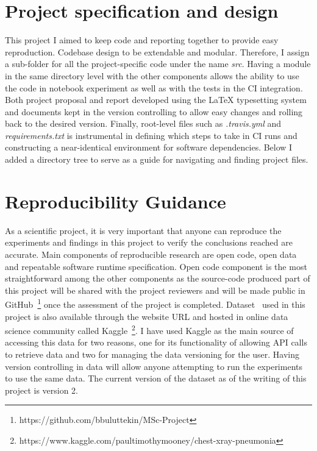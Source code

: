 \section{Project specification and design} \label{sec:projectlayout}
This project I aimed to keep code and reporting together to provide easy reproduction. Codebase design to be extendable and modular. Therefore, I assign a sub-folder for all the project-specific code under the name \emph{src}. Having a module in the same directory level with the other components allows the ability to use the code in notebook experiment as well as with the tests in the CI integration.
Both project proposal and report developed using the LaTeX typesetting system and documents kept in the version controlling to allow easy changes and rolling back to the desired version. Finally, root-level files such as \emph{.travis.yml} and \emph{requirements.txt} is instrumental in defining which steps to take in CI runs and constructing a near-identical environment for software dependencies.
Below I added a directory tree to serve as a guide for navigating and finding project files.


\section{Reproducibility Guidance} \label{sec:reproducibility}
As a scientific project, it is very important that anyone can reproduce the experiments and findings in this project to verify the conclusions reached are accurate. Main components of reproducible research are open code, open data and repeatable software runtime specification. Open code component is the most straightforward among the other components as the source-code produced part of this project will be shared with the project reviewers and will be made public in GitHub~\footnote{https://github.com/bbuluttekin/MSc-Project} once the assessment of the project is completed. Dataset~\cite{dataset} used in this project is also available through the website URL and hosted in online data science community called Kaggle~\footnote{https://www.kaggle.com/paultimothymooney/chest-xray-pneumonia}. I have used Kaggle as the main source of accessing this data for two reasons, one for its functionality of allowing API calls to retrieve data and two for managing the data versioning for the user. Having version controlling in data will allow anyone attempting to run the experiments to use the same data. The current version of the dataset as of the writing of this project is version 2.


